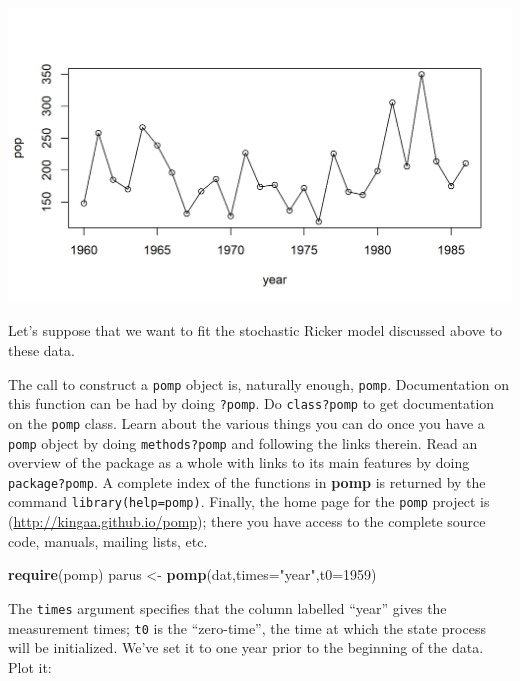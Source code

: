 \documentclass[]{article}
\newenvironment{Shaded}{\begin{snugshade}}{\end{snugshade}}
\newcommand{\KeywordTok}[1]{\textcolor[rgb]{0.13,0.29,0.53}{\textbf{#1}}}
\newcommand{\DataTypeTok}[1]{\textcolor[rgb]{0.13,0.29,0.53}{#1}}
\newcommand{\DecValTok}[1]{\textcolor[rgb]{0.00,0.00,0.81}{#1}}
\newcommand{\StringTok}[1]{\textcolor[rgb]{0.31,0.60,0.02}{#1}}
\newcommand{\NormalTok}[1]{#1}
\begin{document}
\begin{center}\includegraphics{figure/intro-parus-data-1} \end{center}

Let's suppose that we want to fit the stochastic Ricker model discussed
above to these data.

The call to construct a \texttt{pomp} object is, naturally enough,
\texttt{pomp}. Documentation on this function can be had by doing
\texttt{?pomp}. Do \texttt{class?pomp} to get documentation on the
\texttt{pomp} class. Learn about the various things you can do once you
have a \texttt{pomp} object by doing \texttt{methods?pomp} and following
the links therein. Read an overview of the package as a whole with links
to its main features by doing \texttt{package?pomp}. A complete index of
the functions in \textbf{pomp} is returned by the command
\texttt{library(help=pomp)}. Finally, the home page for the
\texttt{pomp} project is (\url{http://kingaa.github.io/pomp}); there you
have access to the complete source code, manuals, mailing lists, etc.

\begin{Shaded}
\begin{Highlighting}[]
\KeywordTok{require}\NormalTok{(pomp)}
\NormalTok{parus <-}\StringTok{ }\KeywordTok{pomp}\NormalTok{(dat,}\DataTypeTok{times=}\StringTok{"year"}\NormalTok{,}\DataTypeTok{t0=}\DecValTok{1959}\NormalTok{)}
\end{Highlighting}
\end{Shaded}

The \texttt{times} argument specifies that the column labelled ``year''
gives the measurement times; \texttt{t0} is the ``zero-time'', the time
at which the state process will be initialized. We've set it to one year
prior to the beginning of the data. Plot it:
\end{document}
